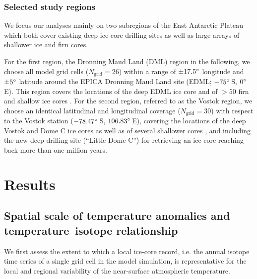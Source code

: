 \documentclass[cp, manuscript]{copernicus}
\begin{document}
\subsubsection{Selected study regions}\label{methods:regions}

We focus our analyses mainly on two subregions of the East Antarctic Plateau
which both cover existing deep ice-core drilling sites as well as large arrays
of shallower ice and firn cores.

For the first region, the Dronning Maud Land (DML) region in the following, we
choose all model grid cells ($N_{\mathrm{grid}}=26$) within a range of
$\pm17.5^{\circ}$ longitude and $\pm5^{\circ}$ latitude around the EPICA Dronning
Maud Land site (EDML; $-75^{\circ}$\,S, $0^{\circ}$\,E). This region covers the
locations of the deep EDML ice core \citep{EPICAcommunitymembers2006} and of
$>50$ firn and shallow ice cores \citep{Altnau2015}. For the second region,
referred to as the Vostok region, we choose an identical latitudinal and
longitudinal coverage ($N_{\mathrm{grid}}=30$) with respect to the Vostok
station ($-78.47^{\circ}$\,S, $106.83^{\circ}$\,E), covering the locations of the
deep Vostok and Dome C ice cores as well as of several shallower cores
\citep{Stenni2017}, and including the new deep drilling site (``Little Dome C'')
for retrieving an ice core reaching back more than one million years.

\section{Results}\label{results}

\subsection{Spatial scale of temperature anomalies and temperature--isotope
  relationship}
\label{results:t2m-iso}

We first assess the extent to which a local ice-core record, i.e. the annual
isotope time series of a single grid cell in the model simulation, is
representative for the local and regional variability of the near-surface
atmospheric temperature.
\end{document}

